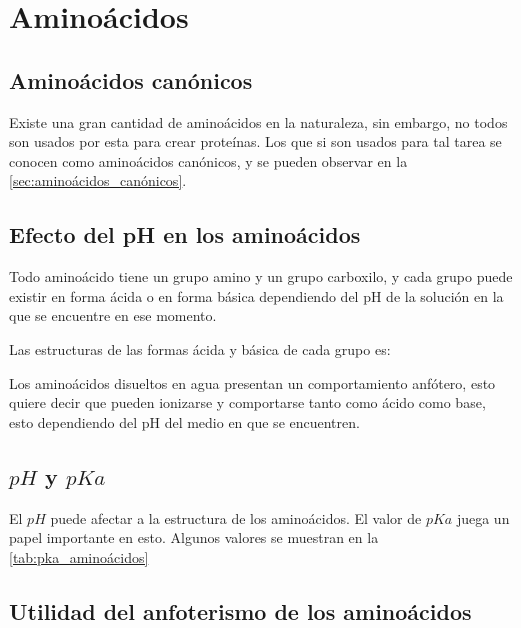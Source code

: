 \section{Aminoácidos}

\subsection{Aminoácidos canónicos}

Existe una gran cantidad de aminoácidos en la naturaleza, sin embargo, no todos son usados por esta para crear proteínas. Los que si son usados para tal tarea se conocen como aminoácidos canónicos, y se pueden observar en la \autoref{sec:aminoácidos_canónicos}.

\subsection{Efecto del pH en los aminoácidos}


Todo aminoácido tiene un grupo amino y un grupo carboxilo, y cada grupo puede existir en forma ácida o en forma básica dependiendo del pH de la solución en la que se encuentre en ese momento.

Las estructuras de las formas ácida y básica de cada grupo es:

    

Los aminoácidos disueltos en agua presentan un comportamiento anfótero, esto quiere decir que pueden ionizarse y comportarse tanto como ácido como base, esto dependiendo del pH del medio en que se encuentren.

\subsection{$pH$ y $pKa$}

El $pH$ puede afectar a la estructura de los aminoácidos. El valor de $pKa$ juega un papel importante en esto. Algunos valores se muestran en la \autoref{tab:pka_aminoácidos}

    

\subsection{Utilidad del anfoterismo de los aminoácidos}

